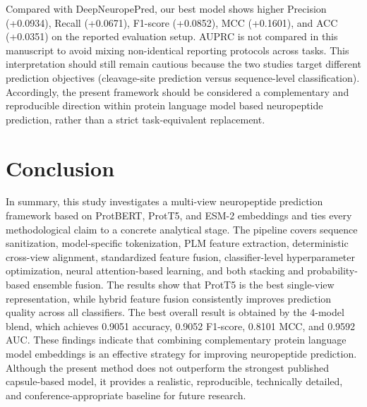 \documentclass[11pt]{article}
\begin{document}
Compared with DeepNeuropePred, our best model shows higher Precision (+0.0934), Recall (+0.0671), F1-score (+0.0852), MCC (+0.1601), and ACC (+0.0351) on the reported evaluation setup. AUPRC is not compared in this manuscript to avoid mixing non-identical reporting protocols across tasks. This interpretation should still remain cautious because the two studies target different prediction objectives (cleavage-site prediction versus sequence-level classification). Accordingly, the present framework should be considered a complementary and reproducible direction within protein language model based neuropeptide prediction, rather than a strict task-equivalent replacement.


\section{Conclusion}
In summary, this study investigates a multi-view neuropeptide prediction framework based on ProtBERT, ProtT5, and ESM-2 embeddings and ties every methodological claim to a concrete analytical stage. The pipeline covers sequence sanitization, model-specific tokenization, PLM feature extraction, deterministic cross-view alignment, standardized feature fusion, classifier-level hyperparameter optimization, neural attention-based learning, and both stacking and probability-based ensemble fusion. The results show that ProtT5 is the best single-view representation, while hybrid feature fusion consistently improves prediction quality across all classifiers. The best overall result is obtained by the 4-model blend, which achieves 0.9051 accuracy, 0.9052 F1-score, 0.8101 MCC, and 0.9592 AUC. These findings indicate that combining complementary protein language model embeddings is an effective strategy for improving neuropeptide prediction. Although the present method does not outperform the strongest published capsule-based model, it provides a realistic, reproducible, technically detailed, and conference-appropriate baseline for future research.
\end{document}
